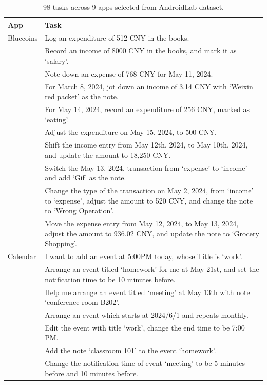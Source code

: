 \begin{longtable}{|p{1.8cm}|p{10.5cm}|}
\caption{98 tasks across 9 apps selected from AndroidLab dataset.}
\label{tab:task-list-androidlab}\\
\hline
\textbf{App} & \textbf{Task} \\
\hline
Bluecoins & Log an expenditure of 512 CNY in the books. \\
          & Record an income of 8000 CNY in the books, and mark it as `salary'. \\
        & Note down an expense of 768 CNY for May 11, 2024. \\
        & For March 8, 2024, jot down an income of 3.14 CNY with `Weixin red packet' as the note. \\
        & For May 14, 2024, record an expenditure of 256 CNY, marked as `eating'. \\
        & Adjust the expenditure on May 15, 2024, to 500 CNY. \\
        & Shift the income entry from May 12th, 2024, to May 10th, 2024, and update the amount to 18,250 CNY. \\
        & Switch the May 13, 2024, transaction from `expense' to `income' and add `Gif' as the note. \\
         & Change the type of the transaction on May 2, 2024, from `income' to `expense', adjust the amount to 520 CNY, and change the note to `Wrong Operation'. \\
        & Move the expense entry from May 12, 2024, to May 13, 2024, adjust the amount to 936.02 CNY, and update the note to `Grocery Shopping'. \\
\hline
Calendar & I want to add an event at 5:00PM today, whose Title is `work'. \\
        & Arrange an event titled `homework' for me at May 21st, and set the notification time to be 10 minutes before. \\
        & Help me arrange an event titled `meeting' at May 13th with note `conference room B202'. \\
        & Arrange an event which starts at 2024/6/1 and repeats monthly. \\
        & Edit the event with title `work', change the end time to be 7:00 PM. \\
        & Add the note `classroom 101' to the event `homework'. \\
        & Change the notification time of event `meeting' to be 5 minutes before and 10 minutes before. \\

\end{longtable}
